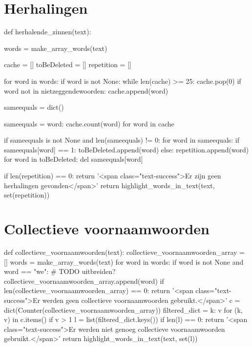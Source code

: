 \section{Herhalingen}
\begin{python}
def herhalende_zinnen(text):

    words = make_array_words(text)

    cache = []
    toBeDeleted = []
    repetition = []

    for word in words:
        if word is not None:
            while len(cache) >= 25:
                cache.pop(0)
            if word not in nietzeggendewoorden:
                cache.append(word)

    sameequals = dict()

    sameequals = {word: cache.count(word) for word in cache}

    if sameequals is not None and len(sameequals) != 0:
        for word in sameequals:
            if sameequals[word] == 1:
                toBeDeleted.append(word)
            else:
                repetition.append(word)
        for word in toBeDeleted:
            del sameequals[word]

    if len(repetition) == 0:
        return '<span class="text-success">Er zijn geen herhalingen gevonden</span>'
    return highlight_words_in_text(text, set(repetition))
\end{python}

\section{Collectieve voornaamwoorden}
\begin{python}
def collectieve_voornaamwoorden(text):
    collectieve_voornaamwoorden_array = []
    words = make_array_words(text)
    for word in words:
        if word is not None and word == "we":  # TODO uitbreiden?
            collectieve_voornaamwoorden_array.append(word)
    if len(collectieve_voornaamwoorden_array) == 0:
        return '<span class="text-success">Er werden geen collectieve voornaamwoorden gebruikt.</span>'
    c = dict(Counter(collectieve_voornaamwoorden_array))
    filtered_dict = {k: v for (k, v) in c.items() if v > 1}
    l = list(filtered_dict.keys())
    if len(l) == 0:
        return '<span class="text-success">Er werden niet genoeg collectieve voornaamwoorden gebruikt.</span>'
    return highlight_words_in_text(text, set(l))
\end{python}

